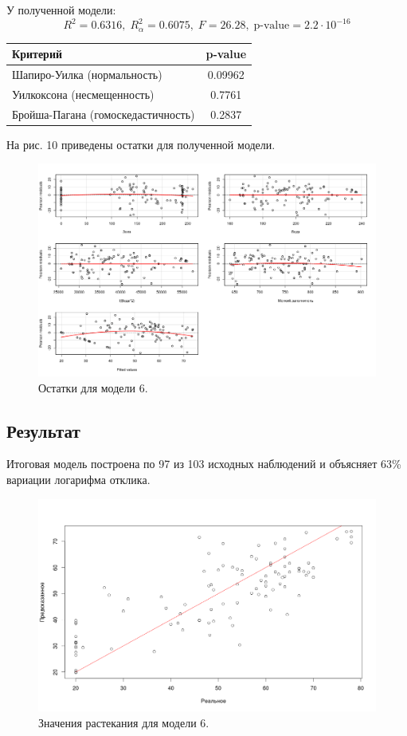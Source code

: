 \documentclass[10pt]{article}
\begin{document}
У полученной модели:
$$
  R^2 = 0.6316, \; R^2_{\alpha} = 0.6075, \; F = 26.28, \; \text{p-value} = 2.2 \cdot 10^{-16}
$$

\begin{tabularx}{\textwidth}{ |X|c| }
  \hline
  Критерий & p-value \\
  \hline
  Шапиро-Уилка (нормальность) & 0.09962 \\
  \hline
  Уилкоксона (несмещенность) & 0.7761 \\
  \hline
  Бройша-Пагана (гомоскедастичность) & 0.2837 \\
  \hline
\end{tabularx}

\bigskip

На рис. 10 приведены остатки для полученной модели.

\begin{figure}[h]
  \centering
  \includegraphics[scale=0.4]{resplots_6.png}
  \caption{Остатки для модели 6.}
\end{figure}

\subsection{Результат}

Итоговая модель построена по 97 из 103 исходных наблюдений и объясняет 63\% вариации логарифма отклика.

\begin{figure}[h]
  \centering
  \includegraphics[scale=0.4]{result.png}
  \caption{Значения растекания для модели 6.}
\end{figure}
\end{document}
